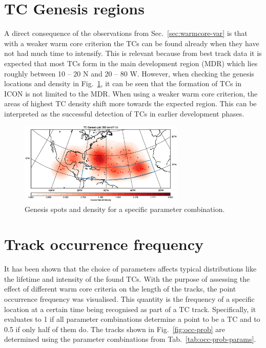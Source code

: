 \section{TC Genesis regions}
A direct consequence of the observations from Sec.~\ref{sec:warmcore-var} is that with a weaker warm core criterion the TCs can be found already when they have not had much time to intensify. This is relevant because from best track data it is expected that most TCs form in the main development region (MDR) which lies roughly between 10 -- 20 \degree N and 20 -- 80 \degree W. However, when checking the genesis locations and density in Fig.~\ref{fig:genesis-temdif1}, it can be seen that the formation of TCs in ICON is not limited to the MDR. When using a weaker warm core criterion, the areas of highest TC density shift more towards the expected region. This can be interpreted as the successful detection of TCs in earlier development phases.
\begin{figure}[!htb]
	\centering
	\includegraphics[width=0.7\textwidth]{img/genesis_plot_temdif1.eps}
	\caption{Genesis spots and density for a specific parameter combination.}
	\label{fig:genesis-temdif1}
\end{figure}

\section{Track occurrence frequency }
It has been shown that the choice of parameters affects typical distributions like the lifetime and intensity of the found TCs. With the purpose of assessing the effect of different warm core criteria on the length of the tracks, the point occurrence frequency was visualised. This quantity is the frequency of a specific location at a certain time being recognised as part of a TC track. Specifically, it evaluates to 1 if all parameter combinations determine a point to be a TC and to 0.5 if only half of them do. The tracks shown in Fig.~\ref{fig:occ-prob} are determined using the parameter combinations from Tab.~\ref{tab:occ-prob-params}.

